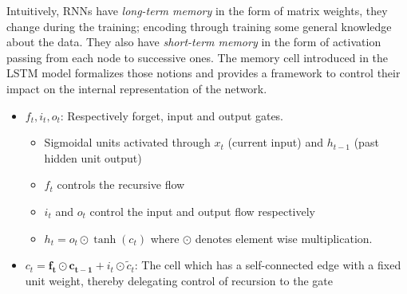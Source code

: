 Intuitively, RNNs have \textit{long-term memory} in the form of matrix weights,
they change during the training; encoding through training some general
knowledge about the data. They also have \textit{short-term memory} in the form
of activation passing from each node to successive ones. The memory cell
introduced in the LSTM model formalizes those notions and provides a framework
to control their impact on the internal representation of the network.
\begin{center}
    \begin{itemize}
    \item $f_t, i_t, o_t$: Respectively forget, input and output gates.
        \begin{itemize}
            \normalsize
            \item Sigmoidal units activated through  $x_t$ (current input) and
                $h_{t-1}$ (past hidden unit output) \item $f_t$ controls the
                recursive flow
            \item $i_t$ and $o_t$ control the input and output flow
                respectively
            \item $h_t = o_t \odot \tanh(c_t)$ where $\odot$ denotes element
                wise multiplication.
        \end{itemize}
    \item $c_t = \mathbf{f_t \odot c_{t-1}} + i_t \odot \tilde{c}_t$: The cell
    which has a self-connected edge with a fixed unit weight, thereby delegating
    control of recursion to the gate
    \end{itemize}
\end{center}
